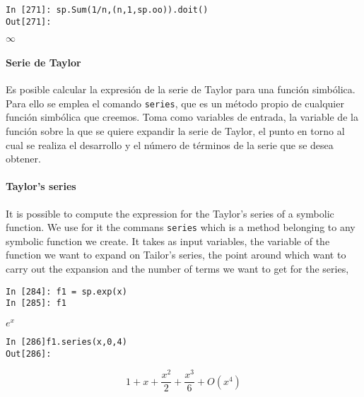 \begin{center}
	\begin{minipage}{.6\textwidth}
		\begin{verbatim}
In [271]: sp.Sum(1/n,(n,1,sp.oo)).doit()
Out[271]:
		\end{verbatim}
	    $\infty$
	\end{minipage}
\end{center}

\begin{paracol}{2}
\paragraph{Serie de Taylor} Es posible calcular la expresión de la serie de Taylor para una función simbólica. Para ello se emplea el comando \texttt{series}, que es un método propio de cualquier función simbólica que creemos. Toma como variables de entrada, la variable de la función sobre la que se quiere expandir la serie de Taylor, el punto en torno al cual se realiza el desarrollo y el número de términos de la serie que se desea obtener.
\switchcolumn
\paragraph{Taylor's series} It is possible to compute the expression for the Taylor's series of a symbolic function. We use for it the commans \texttt{series} which is a method belonging to any symbolic function we create. It takes as input variables, the variable of the function we want to expand on Tailor's series, the point around which want to carry out the expansion and the number of terms we want to get for the series,
\end{paracol}

\begin{center}
	\begin{minipage}{.3\textwidth}
		\begin{verbatim}
In [284]: f1 = sp.exp(x)
In [285]: f1	
		\end{verbatim}
		$e^x$
		\begin{verbatim}
In [286]f1.series(x,0,4)
Out[286]:
		\end{verbatim}
		\begin{equation*}
		1+x+\frac{x^2}{2}+\frac{x^3}{6}+ O(x^4)
		\end{equation*}
	\end{minipage}
\end{center}

